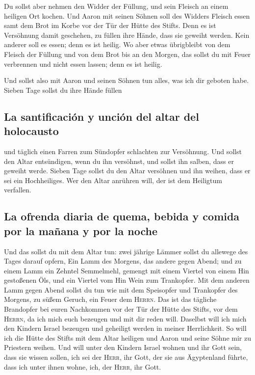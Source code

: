  Du sollst aber nehmen den Widder der Füllung, und sein
Fleisch an einem heiligen Ort kochen.  Und Aaron mit
seinen Söhnen soll des Widders Fleisch essen samt dem Brot im Korbe vor
der Tür der Hütte des Stifts.  Denn es ist Versöhnung
damit geschehen, zu füllen ihre Hände, dass sie geweiht werden. Kein
anderer soll es essen; denn es ist heilig.  Wo aber etwas
übrigbleibt von dem Fleisch der Füllung und von dem Brot bis an den
Morgen, das sollst du mit Feuer verbrennen und nicht essen lassen; denn
es ist heilig.

 Und sollst also mit Aaron und seinen Söhnen tun alles,
was ich dir geboten habe. Sieben Tage sollst du ihre Hände füllen

\hypertarget{la-santificaciuxf3n-y-unciuxf3n-del-altar-del-holocausto}{%
\subsection{La santificación y unción del altar del
holocausto}\label{la-santificaciuxf3n-y-unciuxf3n-del-altar-del-holocausto}}

 und täglich einen Farren zum Sündopfer schlachten zur
Versöhnung. Und sollst den Altar entsündigen, wenn du ihn versöhnst, und
sollst ihn salben, dass er geweiht werde.  Sieben Tage
sollst du den Altar versöhnen und ihn weihen, dass er sei ein
Hochheiliges. Wer den Altar anrühren will, der ist dem Heiligtum
verfallen.

\hypertarget{la-ofrenda-diaria-de-quema-bebida-y-comida-por-la-mauxf1ana-y-por-la-noche}{%
\subsection{La ofrenda diaria de quema, bebida y comida por la mañana y
por la
noche}\label{la-ofrenda-diaria-de-quema-bebida-y-comida-por-la-mauxf1ana-y-por-la-noche}}

 Und das sollst du mit dem Altar tun: zwei jährige Lämmer
sollst du allewege des Tages darauf opfern,  Ein Lamm des
Morgens, das andere gegen Abend;  und zu einem Lamm ein
Zehntel Semmelmehl, gemengt mit einem Viertel von einem Hin gestoßenen
Öls, und ein Viertel vom Hin Wein zum Trankopfer.  Mit
dem anderen Lamm gegen Abend sollst du tun wie mit dem Speisopfer und
Trankopfer des Morgens, zu süßem Geruch, ein Feuer dem \textsc{Herrn}.
 Das ist das tägliche Brandopfer bei euren Nachkommen vor
der Tür der Hütte des Stifts, vor dem \textsc{Herrn}, da ich mich euch
bezeugen und mit dir reden will.  Daselbst will ich mich
den Kindern Israel bezeugen und geheiligt werden in meiner Herrlichkeit.
 So will ich die Hütte des Stifts mit dem Altar heiligen
und Aaron und seine Söhne mir zu Priestern weihen.  Und
will unter den Kindern Israel wohnen und ihr Gott sein, 
dass sie wissen sollen, ich sei der \textsc{Herr}, ihr Gott, der sie aus
Ägyptenland führte, dass ich unter ihnen wohne, ich, der \textsc{Herr},
ihr Gott.

